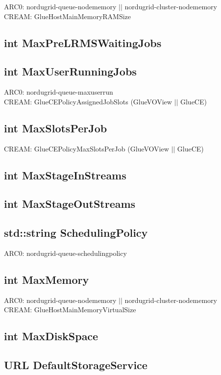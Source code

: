\documentclass{book}
\begin{document}
ARC0: nordugrid-queue-nodememory $||$ nordugrid-cluster-nodememory \\
CREAM: GlueHostMainMemoryRAMSize

\subsection*{int MaxPreLRMSWaitingJobs}

\subsection*{int MaxUserRunningJobs}

ARC0: nordugrid-queue-maxuserrun \\
CREAM: GlueCEPolicyAssignedJobSlots (GlueVOView $||$ GlueCE) %

\subsection*{int MaxSlotsPerJob}

CREAM: GlueCEPolicyMaxSlotsPerJob (GlueVOView $||$ GlueCE)

\subsection*{int MaxStageInStreams}
\subsection*{int MaxStageOutStreams}
\subsection*{std::string SchedulingPolicy}

ARC0: nordugrid-queue-schedulingpolicy

\subsection*{int MaxMemory}

ARC0: nordugrid-queue-nodememory $||$ nordugrid-cluster-nodememory \\
CREAM: GlueHostMainMemoryVirtualSize

\subsection*{int MaxDiskSpace}
\subsection*{URL DefaultStorageService}
\end{document}
